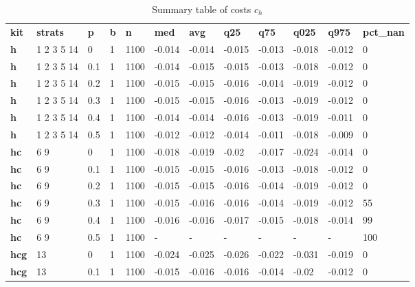 \begin{longtable}[h]{|p{0.8cm}|p{1.5cm}|p{1cm}|p{1cm}|p{1cm}|p{1cm}|p{1cm}|p{1cm}|p{1cm}|p{1cm}|p{1cm}|p{1.5cm}|}
\caption{Summary table of costs $c_h$}
\label{tab:costs_mod_h} \\
      \hline
\textbf{ kit} & \textbf{ strats} & \textbf{ p} & \textbf{ b} & \textbf{ n} & \textbf{ med} & \textbf{ avg} & \textbf{ q25} & \textbf{ q75} & \textbf{ q025} & \textbf{ q975} & \textbf{ pct\_nan}
           \\
  \textbf{h   } &  1 2 3 5 14 &   0 & 1 & 1100 & -0.014 & -0.014 & -0.015 & -0.013 & -0.018 & -0.012 &   0
           \\
  \textbf{h   } &  1 2 3 5 14 & 0.1 & 1 & 1100 & -0.014 & -0.015 & -0.015 & -0.013 & -0.018 & -0.012 &   0
           \\
  \textbf{h   } &  1 2 3 5 14 & 0.2 & 1 & 1100 & -0.015 & -0.015 & -0.016 & -0.014 & -0.019 & -0.012 &   0
           \\
  \textbf{h   } &  1 2 3 5 14 & 0.3 & 1 & 1100 & -0.015 & -0.015 & -0.016 & -0.013 & -0.019 & -0.012 &   0
           \\
  \textbf{h   } &  1 2 3 5 14 & 0.4 & 1 & 1100 & -0.014 & -0.014 & -0.016 & -0.013 & -0.019 & -0.011 &   0
           \\
  \textbf{h   } &  1 2 3 5 14 & 0.5 & 1 & 1100 & -0.012 & -0.012 & -0.014 & -0.011 & -0.018 & -0.009 &   0
           \\
  \textbf{hc  } &  6 9        &   0 & 1 & 1100 & -0.018 & -0.019 &  -0.02 & -0.017 & -0.024 & -0.014 &   0
           \\
  \textbf{hc  } &  6 9        & 0.1 & 1 & 1100 & -0.015 & -0.015 & -0.016 & -0.013 & -0.018 & -0.012 &   0
           \\
  \textbf{hc  } &  6 9        & 0.2 & 1 & 1100 & -0.015 & -0.015 & -0.016 & -0.014 & -0.019 & -0.012 &   0
           \\
  \textbf{hc  } &  6 9        & 0.3 & 1 & 1100 & -0.015 & -0.016 & -0.016 & -0.014 & -0.019 & -0.012 &  55
           \\
  \textbf{hc  } &  6 9        & 0.4 & 1 & 1100 & -0.016 & -0.016 & -0.017 & -0.015 & -0.018 & -0.014 &  99
           \\
  \textbf{hc  } &  6 9        & 0.5 & 1 & 1100 & - & - & - & - & - & - & 100
           \\
  \textbf{hcg } &  13         &   0 & 1 & 1100 & -0.024 & -0.025 & -0.026 & -0.022 & -0.031 & -0.019 &   0
           \\
  \textbf{hcg } &  13         & 0.1 & 1 & 1100 & -0.015 & -0.016 & -0.016 & -0.014 &  -0.02 & -0.012 &   0

\end{longtable}
